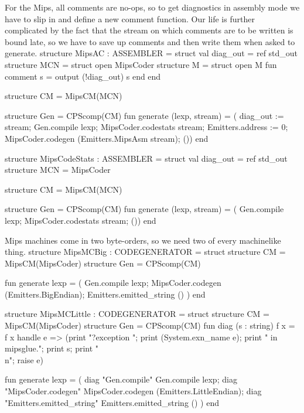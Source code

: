 
\enddocs
{}
For the Mips, all comments are no-ops, so to get diagnostics in
assembly mode we have to slip in and define a new comment function.
Our life is further complicated by the fact that the stream on which
comments are to be written is bound late, so we have to save up comments
and then write them when asked to \code{}generate\edoc{}.
\enddocs
{}
\moddef{*}\endmoddef
structure MipsAC : ASSEMBLER = struct
    val diag_out = ref std_out
    structure MCN = struct
        open MipsCoder
        structure M = struct
            open M
            fun comment s = output (!diag_out) s
        end
    end
        
    structure CM = MipsCM(MCN)
        
    structure Gen = CPScomp(CM)
    fun generate (lexp, stream) = (
        diag_out := stream;
        Gen.compile lexp;
        MipsCoder.codestats stream;
        Emitters.address := 0;
        MipsCoder.codegen (Emitters.MipsAsm stream);
        ())
end

\endcode
{}
\moddef{*}\endmoddef
structure MipsCodeStats : ASSEMBLER = struct
    val diag_out = ref std_out
    structure MCN = MipsCoder
        
    structure CM = MipsCM(MCN)
        
    structure Gen = CPScomp(CM)
    fun generate (lexp, stream) = (
        Gen.compile lexp;
        MipsCoder.codestats stream;
        ())
end

\endcode
{}
Mips machines come in two byte-orders, so we need two of
every machinelike thing.
\enddocs
{}
\moddef{*}\endmoddef
structure MipsMCBig : CODEGENERATOR = struct
    structure CM = MipsCM(MipsCoder)
    structure Gen = CPScomp(CM)
 
    fun generate lexp = (
        Gen.compile lexp;
        MipsCoder.codegen (Emitters.BigEndian);
        Emitters.emitted_string ()
        )
end

structure MipsMCLittle : CODEGENERATOR = struct
    structure CM = MipsCM(MipsCoder)
    structure Gen = CPScomp(CM)
fun diag (s : string) f x =
        f x handle e =>
                (print "?exception "; print (System.exn_name e);
                 print " in mipsglue."; print s; print "\\n";
                 raise e)
 
    fun generate lexp = (
        diag "Gen.compile" Gen.compile lexp;
        diag "MipsCoder.codegen" MipsCoder.codegen (Emitters.LittleEndian);
        diag "Emitters.emitted_string" Emitters.emitted_string ()
        )
end


